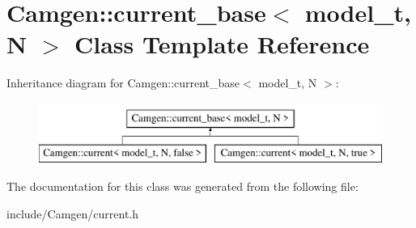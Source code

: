 \hypertarget{a00111}{\section{Camgen\-:\-:current\-\_\-base$<$ model\-\_\-t, N $>$ Class Template Reference}
\label{a00111}
}
Inheritance diagram for Camgen\-:\-:current\-\_\-base$<$ model\-\_\-t, N $>$\-:\begin{figure}[H]
\begin{center}
\leavevmode
\includegraphics[height=2.000000cm]{a00111}
\end{center}
\end{figure}


The documentation for this class was generated from the following file\-:\begin{DoxyCompactItemize}
\item 
include/\-Camgen/current.\-h\end{DoxyCompactItemize}
